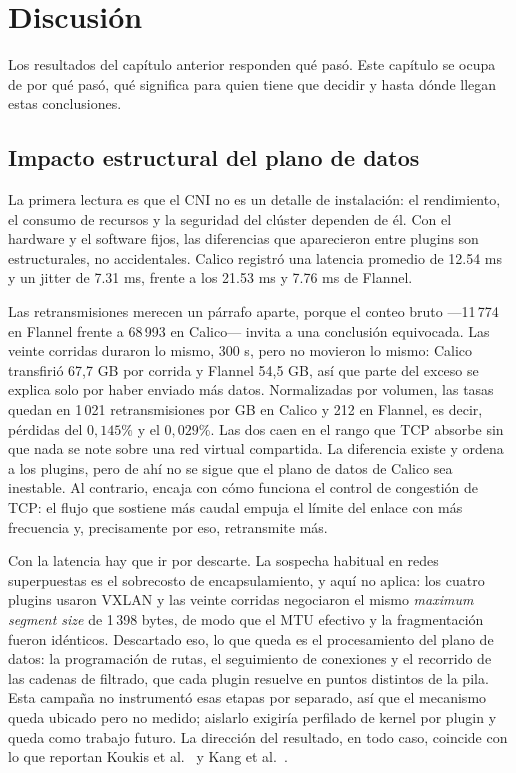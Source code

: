 \chapter{Discusión} \label{sec:Discusion}

Los resultados del capítulo anterior responden qué pasó. Este capítulo se ocupa de por qué pasó, qué significa para quien tiene que decidir y hasta dónde llegan estas conclusiones.

\section{Impacto estructural del plano de datos}
La primera lectura es que el CNI no es un detalle de instalación: el rendimiento, el consumo de recursos y la seguridad del clúster dependen de él. Con el hardware y el software fijos, las diferencias que aparecieron entre plugins son estructurales, no accidentales. Calico registró una latencia promedio de 12.54 ms y un jitter de 7.31 ms, frente a los 21.53 ms y 7.76 ms de Flannel.

Las retransmisiones merecen un párrafo aparte, porque el conteo bruto ---11\,774 en Flannel frente a 68\,993 en Calico--- invita a una conclusión equivocada. Las veinte corridas duraron lo mismo, 300 s, pero no movieron lo mismo: Calico transfirió 67{,}7 GB por corrida y Flannel 54{,}5 GB, así que parte del exceso se explica solo por haber enviado más datos. Normalizadas por volumen, las tasas quedan en 1\,021 retransmisiones por GB en Calico y 212 en Flannel, es decir, pérdidas del $0{,}145\%$ y el $0{,}029\%$. Las dos caen en el rango que TCP absorbe sin que nada se note sobre una red virtual compartida. La diferencia existe y ordena a los plugins, pero de ahí no se sigue que el plano de datos de Calico sea inestable. Al contrario, encaja con cómo funciona el control de congestión de TCP: el flujo que sostiene más caudal empuja el límite del enlace con más frecuencia y, precisamente por eso, retransmite más.

Con la latencia hay que ir por descarte. La sospecha habitual en redes superpuestas es el sobrecosto de encapsulamiento, y aquí no aplica: los cuatro plugins usaron VXLAN y las veinte corridas negociaron el mismo \emph{maximum segment size} de 1\,398 bytes, de modo que el MTU efectivo y la fragmentación fueron idénticos. Descartado eso, lo que queda es el procesamiento del plano de datos: la programación de rutas, el seguimiento de conexiones y el recorrido de las cadenas de filtrado, que cada plugin resuelve en puntos distintos de la pila. Esta campaña no instrumentó esas etapas por separado, así que el mecanismo queda ubicado pero no medido; aislarlo exigiría perfilado de kernel por plugin y queda como trabajo futuro. La dirección del resultado, en todo caso, coincide con lo que reportan Koukis et al.~\cite{ref8} y Kang et al.~\cite{ref7}.

